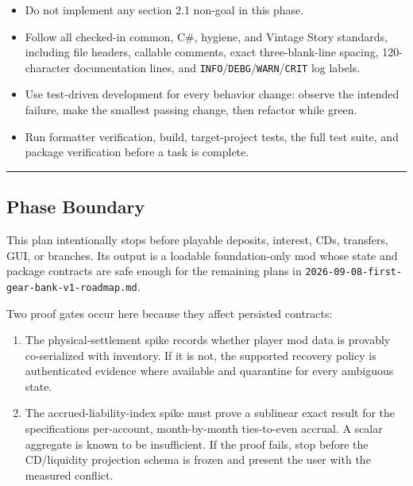\documentclass[
  10pt,
  letterpaper,
]{article}
\newcommand{\passthrough}[1]{#1}
\providecommand{\tightlist}{%
  \setlength{\itemsep}{0pt}\setlength{\parskip}{0pt}}
\begin{document}
\begin{itemize}
  Keep Better Loot, Better Loot Plus, Config Lib, and Integrated Mod
  Manager optional.
\item
  Do not implement any section 2.1 non-goal in this phase.
\item
  Follow all checked-in common, C\#, hygiene, and Vintage Story
  standards, including file headers, callable comments, exact
  three-blank-line spacing, 120-character documentation lines, and
  \passthrough{\lstinline!INFO!}/\passthrough{\lstinline!DEBG!}/\passthrough{\lstinline!WARN!}/\passthrough{\lstinline!CRIT!}
  log labels.
\item
  Use test-driven development for every behavior change: observe the
  intended failure, make the smallest passing change, then refactor
  while green.
\item
  Run formatter verification, build, target-project tests, the full test
  suite, and package verification before a task is complete.
\end{itemize}

\begin{center}\rule{0.5\linewidth}{0.5pt}\end{center}

\subsection{Phase Boundary}\label{phase-boundary}

This plan intentionally stops before playable deposits, interest, CDs,
transfers, GUI, or branches. Its output is a loadable foundation-only
mod whose state and package contracts are safe enough for the remaining
plans in
\texttt{2026-}\allowbreak{}\texttt{09-}\allowbreak{}\texttt{08-}\allowbreak{}\texttt{first-}\allowbreak{}\texttt{gear-}\allowbreak{}\texttt{bank-}\allowbreak{}\texttt{v1-}\allowbreak{}\texttt{roadmap.}\allowbreak{}\texttt{md}.

Two proof gates occur here because they affect persisted contracts:

\begin{enumerate}
\def\labelenumi{\arabic{enumi}.}
\tightlist
\item
  The physical-settlement spike records whether player mod data is
  provably co-serialized with inventory. If it is not, the supported
  recovery policy is authenticated evidence where available and
  quarantine for every ambiguous state.
\item
  The accrued-liability-index spike must prove a sublinear exact result
  for the specification\textquotesingle s per-account, month-by-month
  ties-to-even accrual. A scalar aggregate is known to be insufficient.
  If the proof fails, stop before the CD/liquidity projection schema is
  frozen and present the user with the measured conflict.
\end{enumerate}
\end{document}
